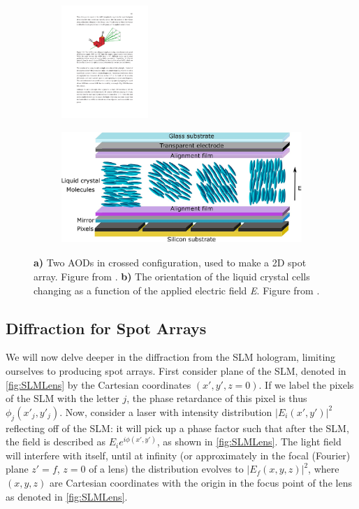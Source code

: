 \begin{figure}
	\begin{subfigure}{.39\textwidth}
		\includegraphics[height=4.25cm]{figures/crossAOD.pdf}
		\caption{}
		\label{fig:CrossAOD}
	\end{subfigure}
	\hfill
	\begin{subfigure}{.59\textwidth}
		\includegraphics[height=4.25cm]{figures/LCoS.png}
		\caption{}
		\label{fig:LCoS}
	\end{subfigure}
	\caption{\textsf{\textbf{a)}} Two \ac{AOD}s in crossed configuration, used to make a 2D spot array. Figure from \cite{Cooper2018}. 
	\textsf{\textbf{b)}} The orientation of the liquid crystal cells changing as a function of the applied electric field \textit{E}. 
	Figure from \cite{Guzman2017}.}
\end{figure}


\subsection{Diffraction for Spot Arrays}\label{sec:PropagationDerivation}

We will now delve deeper in the diffraction from the SLM hologram, limiting ourselves to producing spot arrays.
First consider plane of the SLM, denoted in \cref{fig:SLMLens} by the Cartesian coordinates $(x',y',z=0)$. 
If we label the pixels of the SLM with the letter $j$, the phase retardance of this pixel is thus $\phi_j(x'_j,y'_j)$.
Now, consider a laser with intensity distribution $|E_i(x',y')|^2$ reflecting off of the SLM: it will pick up a phase factor such that after the SLM, the field is described as $E_i e^{i\phi(x',y')}$, as shown in \cref{fig:SLMLens}. 
The light field will interfere with itself, until at infinity (or approximately in the focal (Fourier) plane $z'=f$, $z=0$ of a lens) the distribution evolves to $|E_f(x,y,z)|^2$, where $(x,y,z)$ are Cartesian coordinates with the origin in the focus point of the lens as denoted in \cref{fig:SLMLens}.

